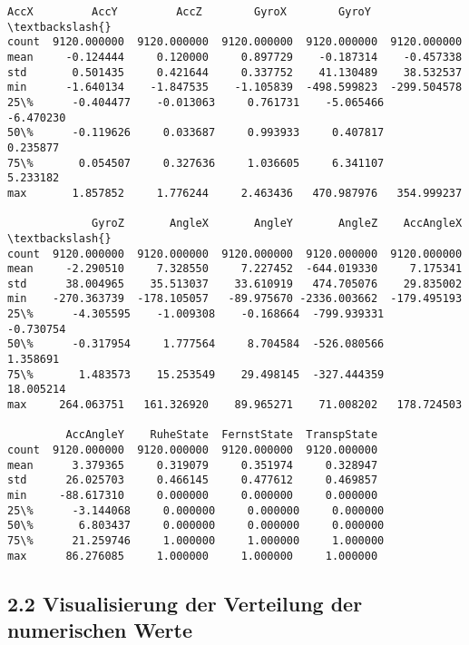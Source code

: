 \documentclass[11pt]{article}
\makeatletter
\newcommand{\boxspacing}{\kern\kvtcb@left@rule\kern\kvtcb@boxsep}
\newcommand{\prompt}[4]{
        {\ttfamily\llap{{\color{#2}[#3]:\hspace{3pt}#4}}\vspace{-\baselineskip}}
    }
\makeatother
\begin{document}
            \begin{tcolorbox}[breakable, size=fbox, boxrule=.5pt, pad at break*=1mm, opacityfill=0]
\prompt{Out}{outcolor}{1}{\boxspacing}
\begin{Verbatim}[commandchars=\\\{\}]
              AccX         AccY         AccZ        GyroX        GyroY  \textbackslash{}
count  9120.000000  9120.000000  9120.000000  9120.000000  9120.000000
mean     -0.124444     0.120000     0.897729    -0.187314    -0.457338
std       0.501435     0.421644     0.337752    41.130489    38.532537
min      -1.640134    -1.847535    -1.105839  -498.599823  -299.504578
25\%      -0.404477    -0.013063     0.761731    -5.065466    -6.470230
50\%      -0.119626     0.033687     0.993933     0.407817     0.235877
75\%       0.054507     0.327636     1.036605     6.341107     5.233182
max       1.857852     1.776244     2.463436   470.987976   354.999237

             GyroZ       AngleX       AngleY       AngleZ    AccAngleX  \textbackslash{}
count  9120.000000  9120.000000  9120.000000  9120.000000  9120.000000
mean     -2.290510     7.328550     7.227452  -644.019330     7.175341
std      38.004965    35.513037    33.610919   474.705076    29.835002
min    -270.363739  -178.105057   -89.975670 -2336.003662  -179.495193
25\%      -4.305595    -1.009308    -0.168664  -799.939331    -0.730754
50\%      -0.317954     1.777564     8.704584  -526.080566     1.358691
75\%       1.483573    15.253549    29.498145  -327.444359    18.005214
max     264.063751   161.326920    89.965271    71.008202   178.724503

         AccAngleY    RuheState  FernstState  TranspState
count  9120.000000  9120.000000  9120.000000  9120.000000
mean      3.379365     0.319079     0.351974     0.328947
std      26.025703     0.466145     0.477612     0.469857
min     -88.617310     0.000000     0.000000     0.000000
25\%      -3.144068     0.000000     0.000000     0.000000
50\%       6.803437     0.000000     0.000000     0.000000
75\%      21.259746     1.000000     1.000000     1.000000
max      86.276085     1.000000     1.000000     1.000000
\end{Verbatim}
\end{tcolorbox}
        
    \hypertarget{visualisierung-der-verteilung-der-numerischen-werte}{%
\subsection*{2.2 Visualisierung der Verteilung der numerischen
Werte}\label{visualisierung-der-verteilung-der-numerischen-werte}}
\end{document}
